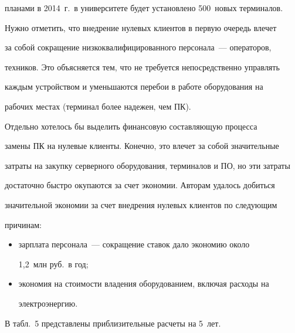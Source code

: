 планами в 2014~г.\ в университете будет установлено 500~новых терминалов. 

  

  Нужно отметить, что внедрение нулевых клиентов в первую очередь влечет 

за собой сокращение низкоквалифицированного персонала~--- операторов, 

техников. Это объясняется тем, что не требуется непосредственно управлять 

каждым устройством и уменьшаются перебои в работе оборудования на 

рабочих местах (терминал более надежен, чем ПК).

  

  Отдельно хотелось бы выделить финансовую составляющую процесса 

замены ПК на нулевые клиенты. Конечно, это влечет за собой значительные 

затраты на закупку серверного оборудования, терминалов и ПО, но эти затраты 

достаточно быстро окупаются за счет экономии. Авторам удалось добиться 

значительной экономии за счет внедрения нулевых клиентов по следующим 

причинам: 

  \begin{itemize}

\item зарплата персонала~--- сокращение ставок дало экономию около 

1,2~млн руб.\ в год;

\item экономия на стоимости владения оборудованием, включая расходы на 

электроэнергию. 

\end{itemize}

  

  В табл.~5 представлены приблизительные расчеты на 5~лет. 

  

